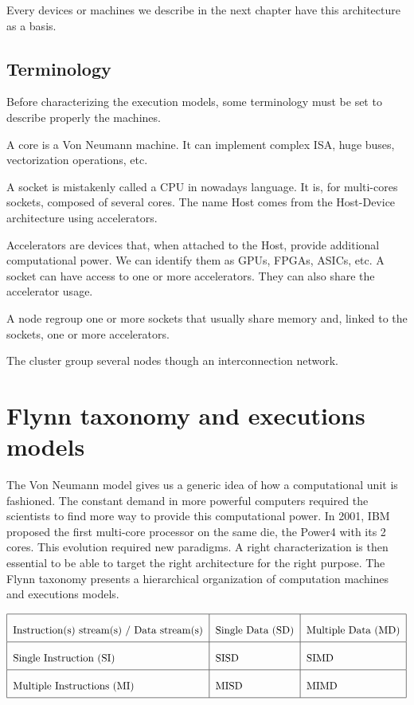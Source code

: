 Every devices or machines we describe in the next chapter have this architecture as a basis. 

\subsection{Terminology}
Before characterizing the execution models, some terminology must be set to describe properly the machines. 

\begin{description}
\item[Core:] A core is a Von Neumann machine. It can implement complex ISA, huge buses, vectorization operations, etc.
\item[Socket/Host:] A socket is mistakenly called a CPU in nowadays language. It is, for multi-cores sockets, composed of several cores. The name Host comes from the Host-Device architecture using accelerators. 
\item[Accelerators/Devices:] Accelerators are devices that, when attached to the Host, provide additional computational power. 
We can identify them as GPUs, FPGAs, ASICs, etc. 
A socket can have access to one or more accelerators.
They can also share the accelerator usage. 
\item[Node:] A node regroup one or more sockets that usually share memory and, linked to the sockets, one or more accelerators. 
\item[Cluster/Supercomputer] The cluster group several nodes though an interconnection network.
\end{description}

\section{Flynn taxonomy and executions models}
The Von Neumann model gives us a generic idea of how a computational unit is fashioned. 
The constant demand in more powerful computers required the scientists to find more way to provide this computational power.
In 2001, IBM proposed the first multi-core processor on the same die, the Power4 with its 2 cores.
This evolution required new paradigms.
A right characterization is then essential to be able to target the right architecture for the right purpose. 
The Flynn taxonomy presents a hierarchical organization of computation machines and executions models.

\begin{table}
\begin{center}
\[\arraycolsep=1.4pt\def\arraystretch{2.2}
\begin{tabular}{| l | l | l |}
\hline
Instruction(s) stream(s) / Data stream(s)	& Single Data (SD) 	& Multiple Data (MD) \\
\hline
Single Instruction (SI)		& SISD			& SIMD \\
\hline
Multiple Instructions (MI) 	& MISD		& MIMD \\
\hline
\end{tabular}
\]
\end{center}
\caption{Flynn's taxonomy}
\label{fig:1_HPC:flynn_taxonomy}
\end{table}


